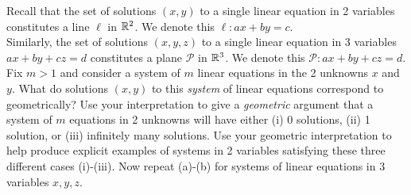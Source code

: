 \bb
\ii Recall that the set of solutions $(x,y)$ to a single linear equation in 2 variables constitutes a line $\ell$ in ${\mathbb R}^2$. We denote this $\ell\colon ax+by=c$. 
\\
Similarly, the set of solutions $(x,y,z)$ to a single linear equation in 3 variables $ax+by+cz=d$ constitutes a plane $\mathcal{P}$ in ${\mathbb R}^3$. We denote this $\mathcal{P}\colon ax+by+cz=d$. 
\bb[(a)]
\ii Fix $m>1$ and consider a system of $m$ linear equations in the 2 unknowns $x$ and $y$. What do solutions $(x,y)$ to this \emph{system} of linear equations correspond to geometrically? 
\ii Use your interpretation to give a {\em geometric} argument that a system of $m$ equations in 2 unknowns will have either (i) 0 solutions, (ii) 1 solution, or (iii) infinitely many solutions. 
\ii Use your geometric interpretation to help produce explicit examples of systems in 2 variables satisfying these three different cases (i)-(iii).
\ii Now repeat (a)-(b) for systems of linear equations in 3 variables $x,y, z$.  
\ee 
\ \\
